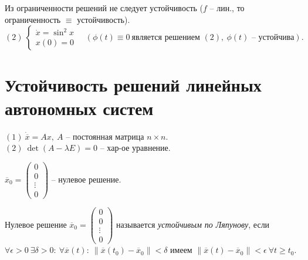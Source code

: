 \begin{remark}
	Из ограниченности решений не следует устойчивость ($f$ -- лин., то ограниченность $\equiv $ устойчивость).
	\[
		(2) \ \left\{\begin{array}{l}
			\dot{x} = \sin^2 x \\
			x(0) = 0
		\end{array}\right. \quad (\phi (t) \equiv 0 \ \text{является решением }(2), \ \phi (t) \text{ -- устойчива}).
	\]
\end{remark}

\section{Устойчивость решений линейных автономных систем}

$(1) \ \dot{\overline{x} } = Ax, \ A$ -- постоянная матрица $n \times n$. \\
$(2) \ \det (A - \lambda E) = 0$ -- хар-ое уравнение.

$\overline{x} _0 = \left(\begin{array}{c}
			0 \\ 0 \\ \vdots \\ 0
		\end{array}\right)$ -- нулевое решение.

\begin{definition}
	Нулевое решение $\overline{x} _0 = \left(\begin{array}{c}
				0 \\ 0 \\ \vdots \\ 0
			\end{array}\right)$ называется \emph{устойчивым по Ляпунову}, если $\forall \epsilon  > 0 \ \exists \delta  > 0: \ \forall \overline{x} (t): \ \big\| \overline{x} (t_0) - \overline{x} _0 \big\| < \delta $ имеем $\big\| \overline{x} (t) - \overline{x} _0\big\| < \epsilon \ \forall t \geqslant t_0$.
\end{definition}

